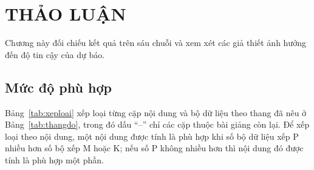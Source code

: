 \clearpage
\section[Thảo luận]{THẢO LUẬN}

Chương này đối chiếu kết quả trên sáu chuỗi và xem xét các giả thiết ảnh hưởng đến độ tin cậy của dự báo.

\subsection{Mức độ phù hợp}

Bảng~\ref{tab:xeploai} xếp loại từng cặp nội dung và bộ dữ liệu theo thang đã nêu ở Bảng~\ref{tab:thangdo}, trong đó dấu ``--'' chỉ các cặp thuộc bài giảng còn lại. Để xếp loại theo nội dung, một nội dung được tính là phù hợp khi số bộ dữ liệu xếp P nhiều hơn số bộ xếp M hoặc K; nếu số P không nhiều hơn thì nội dung đó được tính là phù hợp một phần.

